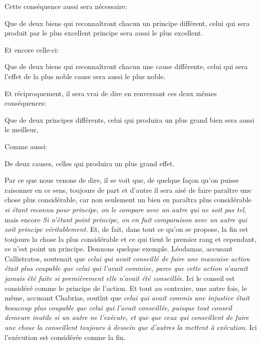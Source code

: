 \bigbreak

Cette conséquence aussi sera nécessaire:

\begin{lieu}
	Que de deux biens qui reconnaîtront chacun un principe différent, celui qui sera produit par le plus excellent principe
	sera aussi le plus excellent.
\end{lieu}

Et encore celle-ci:

\begin{lieu}
	Que de deux biens qui reconnaîtront chacun une cause différente, celui qui sera l'effet de la plus noble cause sera aussi
	le plus noble.
\end{lieu}

\bigbreak

Et réciproquement, il sera vrai de dire en renversant ces deux mêmes conséquences:

\begin{lieu}
	Que de deux principes différents, celui qui produira un plus grand bien sera aussi le meilleur,
\end{lieu}

Comme aussi:

\begin{lieu}
	De deux causes, celles qui produira un plus grand effet.
\end{lieu}

Par ce que nous venons de dire, il se voit que, de quelque façon qu'on puisse raisonner en ce sens, toujours de part et d'autre
il sera aisé de faire paraître une chose plus considérable, car non seulement un bien en paraîtra plus considérable \emph{si
étant reconnu pour principe, on le compare avec un autre qui ne soit pas tel}, mais encore \emph{Si n'étant point principe, on
en fait comparaison avec un autre qui soit principe véritablement}. Et, de fait, dans tout ce qu'on se propose, la fin est
toujours la chose la plus considérable et ce qui tient le premier rang et cependant, ce n'est point un principe. Donnons
quelque exemple. Léodamas, accusant Callistratos, soutenait que \emph{celui qui avait conseillé de faire une mauvaise action 
était plus coupable que celui qui l'avait commise, parce que cette action n'aurait jamais été faite si premièrement elle n'avait
été conseillée}. Ici le conseil est considéré comme le principe de l'action. Et tout au contraire, une autre fois, le même,
accusant Chabrias, soutînt que \emph{celui qui avait commis une injustice était beaucoup plus coupable que celui qui l'avait
conseillée, puisque tout conseil demeure inutile si un autre ne l’exécute, et que que ceux qui conseillent de faire une chose
la conseillent toujours à dessein que d'autres la mettent à exécution}. Ici l’exécution est considérée comme la fin.

